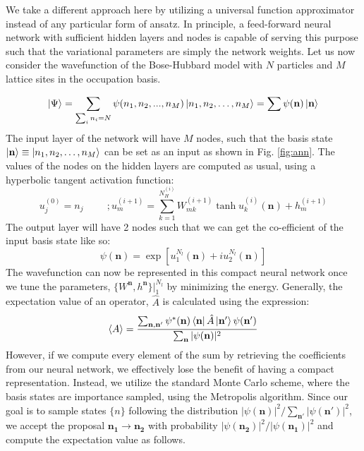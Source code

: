 We take a different approach here by utilizing a universal function approximator instead of any particular form of ansatz. In principle, a feed-forward neural network with sufficient hidden layers and nodes is capable of serving this purpose\cite{lu2020universal} such that the variational parameters are simply the network weights. Let us now consider the wavefunction of the Bose-Hubbard model with $N$ particles and $M$ lattice sites in the occupation basis.

\begin{equation}
    \ket{\Psi} = \sum_{\sum_i n_i = N }\psi(n_1, n_2, ..., n_M)\ket{n_1, n_2, \dots, n_M} = \sum \psi(\mathbf{n})\ket{\textbf{n}}
\end{equation}
The input layer of the network will have $M$ nodes, such that the basis state $\ket{\mathbf{n}} \equiv \ket{n_1, n_2, \dots, n_M}$ can be set as an input as shown in Fig. \ref{fig:ann}. The values of the nodes on the hidden layers are computed as usual, using a hyperbolic tangent activation function:
\begin{equation}
    u_j^{(0)} = n_j \hspace{1cm}; u_m^{(i+1)} = \sum_{k = 1}^{N_H^{(i)}}W_{mk}^{(i+1)}\tanh u_k^{(i)}(\mathbf{n}) + h_m^{(i+1)}
\end{equation}
The output layer will have 2 nodes such that we can get the co-efficient of the input basis state like so:
\begin{equation}
    \psi(\mathbf{n}) = \exp[u_1^{N_l}(\mathbf{n}) + iu_2^{N_l}(\mathbf{n})]
\end{equation}
The wavefunction can now be represented in this compact neural network once we tune the parameters, $\{W^{\mathbf{n}}, h^{\mathbf{n}}\}|_1^{N_l}$ by minimizing the energy. Generally, the expectation value of an operator, $\hat{A}$ is calculated using the expression:
\begin{equation}
    \langle A \rangle = \frac{\sum_{\mathbf{n}, \mathbf{n}'} \psi^*(\mathbf{n})\bra{\mathbf{n}}\hat{A}\ket{\mathbf{n}'}\psi(\mathbf{n}')}{\sum_\mathbf{n} |\psi(\mathbf{n})|^2}
\end{equation}
However, if we compute every element of the sum by retrieving the coefficients from our neural network, we effectively lose the benefit of having a compact representation. Instead, we utilize the standard Monte Carlo scheme, where the basis states are importance sampled, using the Metropolis algorithm. Since our goal is to sample states $\{n\}$ following the distribution $|\psi(\mathbf{n})|^2/\sum_{\mathbf{n}'}|\psi(\mathbf{n}')|^2$, we accept the proposal $\mathbf{n_1} \rightarrow \mathbf{n_2}$ with probability $|\psi(\mathbf{n_2})|^2/|\psi(\mathbf{n_1})|^2$ and compute the expectation value as follows.
